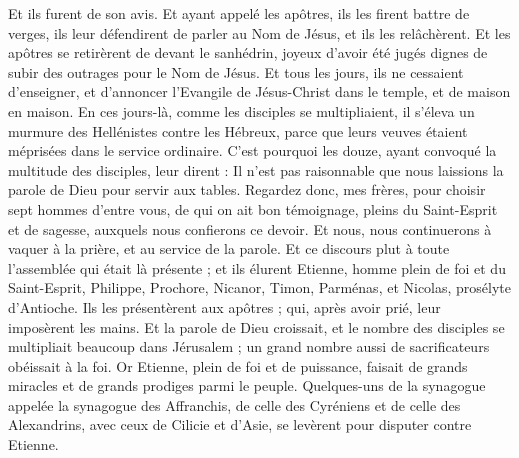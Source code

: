 \begin{multicols}{2}
Et ils furent de son avis. Et ayant appelé les apôtres, ils les firent battre de verges, ils leur défendirent de parler au Nom de Jésus, et ils les relâchèrent.
Et les apôtres se retirèrent de devant le sanhédrin, joyeux d'avoir été jugés dignes de subir des outrages pour le Nom de Jésus.
Et tous les jours, ils ne cessaient d'enseigner, et d'annoncer l'Evangile de Jésus-Christ dans le temple, et de maison en maison.
\VerseOne{}En ces jours-là, comme les disciples se multipliaient, il s'éleva un murmure des Hellénistes contre les Hébreux, parce que leurs veuves étaient méprisées dans le service ordinaire.
C'est pourquoi les douze, ayant convoqué la multitude des disciples, leur dirent : Il n'est pas raisonnable que nous laissions la parole de Dieu pour servir aux tables.
Regardez donc, mes frères, pour choisir sept hommes d'entre vous, de qui on ait bon témoignage, pleins du Saint-Esprit et de sagesse, auxquels nous confierons ce devoir.
Et nous, nous continuerons à vaquer à la prière, et au service de la parole.
Et ce discours plut à toute l'assemblée qui était là présente ; et ils élurent Etienne, homme plein de foi et du Saint-Esprit, Philippe, Prochore, Nicanor, Timon, Parménas, et Nicolas, prosélyte d'Antioche.
Ils les présentèrent aux apôtres ; qui, après avoir prié, leur imposèrent les mains.
Et la parole de Dieu croissait, et le nombre des disciples se multipliait beaucoup dans Jérusalem ; un grand nombre aussi de sacrificateurs obéissait à la foi.
Or Etienne, plein de foi et de puissance, faisait de grands miracles et de grands prodiges parmi le peuple.
Quelques-uns de la synagogue appelée la synagogue des Affranchis, de celle des Cyréniens et de celle des Alexandrins, avec ceux de Cilicie et d'Asie, se levèrent pour disputer contre Etienne.

\end{multicols}
